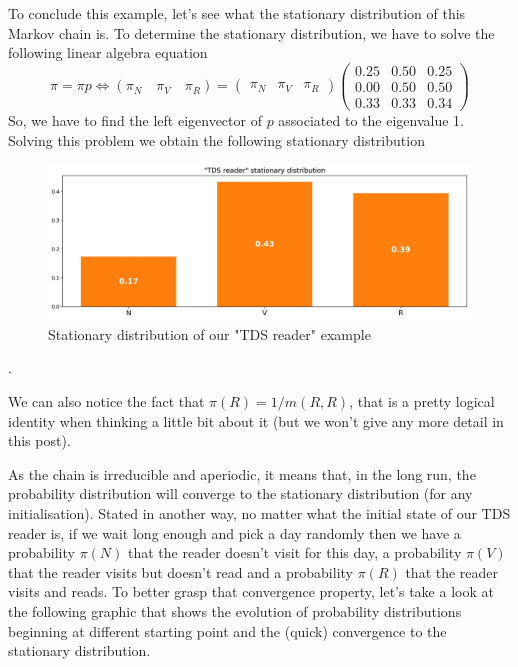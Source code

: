 To conclude this example, let's see what the stationary distribution of this Markov chain is. To determine the stationary distribution, we have to solve the following linear algebra equation
\begin{equation}\pi=\pi p \Longleftrightarrow\left(\pi_{N} \quad \pi_{V} \quad \pi_{R}\right)=\left(\begin{array}{ccc}
\pi_{N} & \pi_{V} & \pi_{R}
\end{array}\right)\left(\begin{array}{ccc}
0.25 & 0.50 & 0.25 \\
0.00 & 0.50 & 0.50 \\
0.33 & 0.33 & 0.34
\end{array}\right)\end{equation}
So, we have to find the left eigenvector of $p$ associated to the eigenvalue 1. Solving this problem we obtain the following stationary distribution



\begin{figure}[h]
    \centering
\includegraphics[width=\textwidth]{pic/p05c07-snip08.png}
    \caption{Stationary distribution of our "TDS reader" example}
    \label{fig:p05c07-snip08}
\end{figure}


.

We can also notice the fact that $\pi(R) = 1/m(R,R)$, that is a pretty logical identity when thinking a little bit about it (but we won't give any more detail in this post).

As the chain is irreducible and aperiodic, it means that, in the long run, the probability distribution will converge to the stationary distribution (for any initialisation). Stated in another way, no matter what the initial state of our TDS reader is, if we wait long enough and pick a day randomly then we have a probability $\pi(N)$ that the reader doesn't visit for this day, a probability $\pi(V)$ that the reader visits but doesn't read and a probability $\pi(R)$ that the reader visits and reads. To better grasp that convergence property, let's take a look at the following graphic that shows the evolution of probability distributions beginning at different starting point and the (quick) convergence to the stationary distribution.


